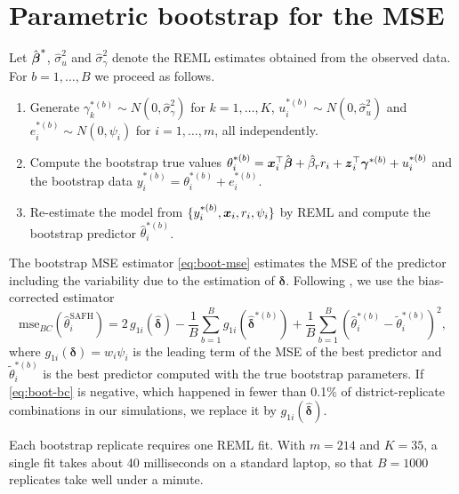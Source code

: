 \section{Parametric bootstrap for the MSE}
\label{app:bootstrap}

Let $\hat{\boldsymbol{\beta}}^{*}$, $\hat\sigma_u^2$ and $\hat\sigma_\gamma^2$ denote the REML
estimates obtained from the observed data. For $b = 1, \dots, B$ we proceed as
follows.
\begin{enumerate}
  \item Generate $\gamma_k^{*(b)} \sim N(0, \hat\sigma_\gamma^2)$ for
  $k = 1, \dots, K$, $u_i^{*(b)} \sim N(0, \hat\sigma_u^2)$ and
  $e_i^{*(b)} \sim N(0, \psi_i)$ for $i = 1, \dots, m$, all independently.
  \item Compute the bootstrap true values
  $\theta_i^{*(b)} = \boldsymbol{x}_i^\top \hat{\boldsymbol{\beta}} + \hat\beta_r r_i +
  \boldsymbol{z}_i^\top \boldsymbol{\gamma}^{*(b)} + u_i^{*(b)}$ and the
  bootstrap data $y_i^{*(b)} = \theta_i^{*(b)} + e_i^{*(b)}$.
  \item Re-estimate the model from $\{y_i^{*(b)}, \boldsymbol{x}_i, r_i, \psi_i\}$ by REML
  and compute the bootstrap predictor $\hat\theta_i^{*(b)}$.
\end{enumerate}
The bootstrap MSE estimator \eqref{eq:boot-mse} estimates the MSE of the
predictor including the variability due to the estimation of
$\boldsymbol{\delta}$. Following \citet{butar2003measuring}, we use the
bias-corrected estimator
\begin{equation}
  \mathrm{mse}_{BC}(\hat\theta_i^{\mathrm{SAFH}}) =
  2\, g_{1i}(\hat{\boldsymbol{\delta}}) - \frac{1}{B} \sum_{b=1}^{B}
  g_{1i}(\hat{\boldsymbol{\delta}}^{*(b)})
  + \frac{1}{B} \sum_{b=1}^{B}
  \left( \hat\theta_i^{*(b)} - \tilde\theta_i^{*(b)} \right)^2,
  \label{eq:boot-bc}
\end{equation}
where $g_{1i}(\boldsymbol{\delta}) = w_i \psi_i$ is the leading term of the MSE
of the best predictor and $\tilde\theta_i^{*(b)}$ is the best predictor computed
with the true bootstrap parameters. If \eqref{eq:boot-bc} is negative, which
happened in fewer than 0.1\% of district-replicate combinations in our
simulations, we replace it by $g_{1i}(\hat{\boldsymbol{\delta}})$.

Each bootstrap replicate requires one REML fit. With $m = 214$ and $K = 35$,
a single fit takes about 40 milliseconds on a standard laptop, so that
$B = 1000$ replicates take well under a minute.
